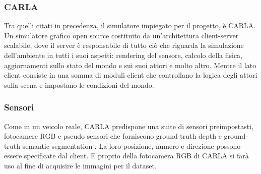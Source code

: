 \documentclass[14pt]{extarticle}
\begin{document}
\subsubsection{CARLA}
Tra quelli citati in precedenza, il simulatore  impiegato per il progetto, è CARLA.
Un simulatore grafico open source costituito da un'architettura client-server scalabile, dove il server è responsabile  di tutto ciò che riguarda la simulazione dell'ambiente in tutti i suoi aspetti: rendering del sensore, calcolo della fisica, aggiornamenti sullo stato del mondo e sui suoi attori e molto altro. 
Mentre il lato client consiste in una somma di moduli client che controllano la logica degli attori sulla scena e impostano le condizioni del mondo.
\subsubsection{Sensori}
Come in un  veicolo reale, CARLA predispone una suite di sensori preimpostasti, fotocamere RGB e pseudo sensori che forniscono ground-truth depth e ground-truth semantic segmentation .
La loro posizione, numero e direzione possono essere specificate dal client.
E proprio della fotocamera RGB di CARLA si farà uso al fine di acquisire le immagini per il dataset.
\end{document}
